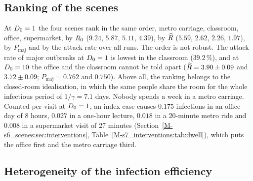 \subsection{Ranking of the scenes}\label{s6_scenes:sec:ranking}

At $D_0=1$ the four scenes rank in the same order, metro carriage, classroom, office, supermarket, by $R_0$
($9.24$, $5.87$, $5.11$, $4.39$), by $\widehat{R}$ ($5.59$, $2.62$, $2.26$, $1.97$), by $P_{\mathrm{maj}}$ and by the
attack rate over all runs.
The order is not robust. The attack rate of major outbreaks at $D_0=1$ is lowest in the classroom ($39.2\,\%$),
and at $D_0=10$ the office and the classroom cannot be told apart ($\widehat{R}=3.90\pm0.09$ and $3.72\pm0.09$;
$P_{\mathrm{maj}}=0.762$ and $0.750$).
Above all, the ranking belongs to the closed-room idealisation, in which the same people share the room for the
whole infectious period of $1/\gamma=7.1$ days. Nobody spends a week in a metro carriage. Counted per visit at
$D_0=1$, an index case causes $0.175$ infections in an office day of 8 hours, $0.027$ in a one-hour lecture,
$0.018$ in a 20-minute metro ride and $0.008$ in a supermarket visit of 27 minutes
(Section~\ref{M-s6_scenes:sec:interventions}, Table~\ref{M-s7_interventions:tab:dwell}), which puts the office first and the
metro carriage third.

\subsection{Heterogeneity of the infection efficiency}\label{s7_interventions:sec:hetero}

